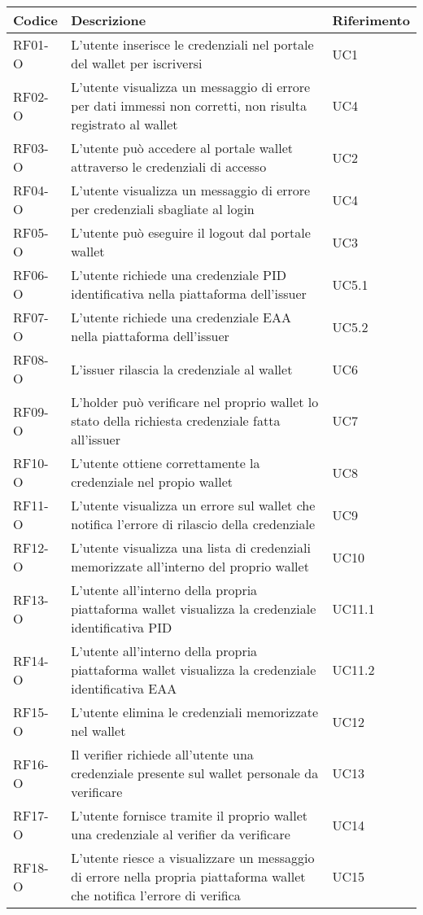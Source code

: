     \begin{tabular}{|p{}|p{}|p{}|}
        \hline
        \textbf{Codice} & \textbf{Descrizione} & \textbf{Riferimento} \\
        \hline
        RF01-O & L'utente inserisce le credenziali nel portale del wallet per iscriversi & UC1\\
        RF02-O & L'utente visualizza un messaggio di errore per dati immessi non corretti, non risulta registrato al wallet & UC4\\
        RF03-O & L'utente può accedere al portale wallet attraverso le credenziali di accesso & UC2\\
        RF04-O & L'utente visualizza un messaggio di errore per credenziali sbagliate al login & UC4\\ 
        RF05-O & L'utente può eseguire il logout dal portale wallet & UC3\\
        RF06-O & L'utente richiede una credenziale PID identificativa nella piattaforma dell'issuer & UC5.1\\
        RF07-O & L'utente richiede una credenziale EAA nella piattaforma dell'issuer & UC5.2\\
        RF08-O & L'issuer rilascia la credenziale al wallet & UC6\\
        RF09-O & L'holder può verificare nel proprio wallet lo stato della richiesta credenziale fatta all'issuer & UC7\\
        RF10-O & L'utente ottiene correttamente la credenziale nel propio wallet & UC8\\
        RF11-O & L'utente visualizza un errore sul wallet che notifica l'errore di rilascio della credenziale & UC9\\
        RF12-O & L'utente visualizza una lista di credenziali memorizzate all'interno del proprio wallet& UC10\\
        RF13-O & L'utente all'interno della propria piattaforma wallet visualizza la credenziale identificativa PID & UC11.1\\
        RF14-O & L'utente all'interno della propria piattaforma wallet visualizza la credenziale identificativa EAA & UC11.2\\
        RF15-O & L'utente elimina le credenziali memorizzate nel wallet & UC12\\
        RF16-O & Il verifier richiede all'utente una credenziale presente sul wallet personale da verificare & UC13\\
        RF17-O & L'utente fornisce tramite il proprio wallet una credenziale al verifier da verificare & UC14\\
        RF18-O & L'utente riesce a visualizzare un messaggio di errore nella propria piattaforma wallet che notifica l'errore di verifica & UC15\\
        \hline
    \end{tabular}

